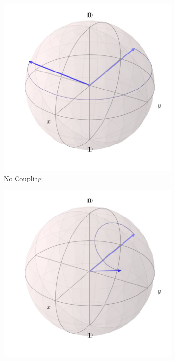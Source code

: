 \begin{itemize}
\begin{figure}
\centering
\begin{subfigure}[b]{0.45\textwidth}
\centering
\includegraphics[width=\textwidth]{Figures/rotatez.png}
\caption{No Coupling}
\label{fig:rotatez}
\end{subfigure}
\hfill
\begin{subfigure}[b]{0.45\textwidth}
\centering
\includegraphics[width=\textwidth]{Figures/rotatex.png}

\end{subfigure}
\end{figure}
\end{itemize}
